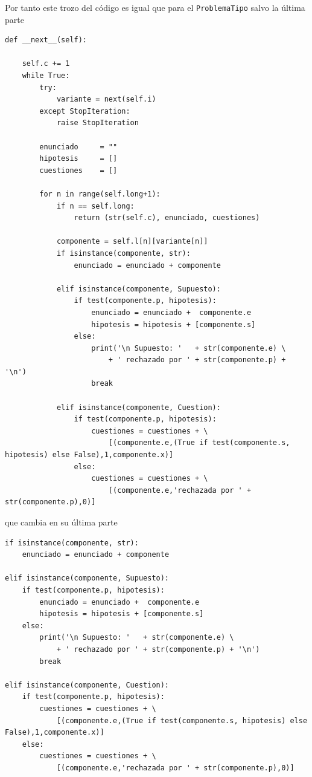 \documentclass[10pt,a4paper]{report}
\begin{document}
Por tanto este trozo del código es igual que para el \texttt{ProblemaTipo} salvo la última parte
\begin{verbatim}
def __next__(self):
    
    self.c += 1
    while True:
        try:
            variante = next(self.i)
        except StopIteration:
            raise StopIteration

        enunciado     = ""
        hipotesis     = []
        cuestiones    = []
                     
        for n in range(self.long+1):
            if n == self.long:
                return (str(self.c), enunciado, cuestiones)
    
            componente = self.l[n][variante[n]]
            if isinstance(componente, str):
                enunciado = enunciado + componente
                
            elif isinstance(componente, Supuesto):
                if test(componente.p, hipotesis):
                    enunciado = enunciado +  componente.e
                    hipotesis = hipotesis + [componente.s]
                else:
                    print('\n Supuesto: '   + str(componente.e) \
                        + ' rechazado por ' + str(componente.p) + '\n')
                    break
                
            elif isinstance(componente, Cuestion):
                if test(componente.p, hipotesis):
                    cuestiones = cuestiones + \
                        [(componente.e,(True if test(componente.s, hipotesis) else False),1,componente.x)]
                else:
                    cuestiones = cuestiones + \
                        [(componente.e,'rechazada por ' + str(componente.p),0)]
\end{verbatim}
que cambia en su última parte
\begin{verbatim}
if isinstance(componente, str):
    enunciado = enunciado + componente
    
elif isinstance(componente, Supuesto):
    if test(componente.p, hipotesis):
        enunciado = enunciado +  componente.e
        hipotesis = hipotesis + [componente.s]
    else:
        print('\n Supuesto: '   + str(componente.e) \
            + ' rechazado por ' + str(componente.p) + '\n')
        break
    
elif isinstance(componente, Cuestion):
    if test(componente.p, hipotesis):
        cuestiones = cuestiones + \
            [(componente.e,(True if test(componente.s, hipotesis) else False),1,componente.x)]
    else:
        cuestiones = cuestiones + \
            [(componente.e,'rechazada por ' + str(componente.p),0)]
\end{verbatim}
\end{document}
